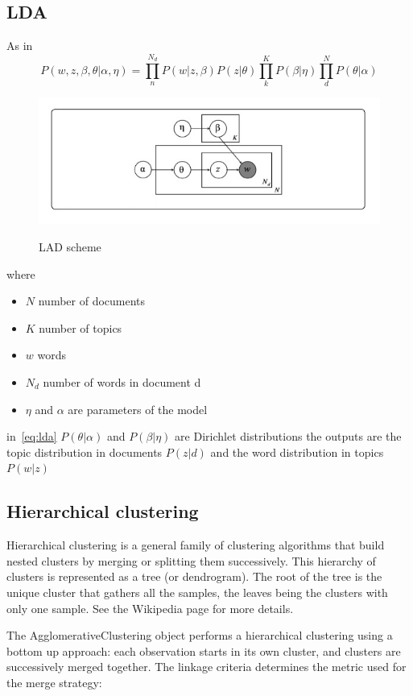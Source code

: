 \subsection{LDA}

As in ~\cite{Zhou2016}
\begin{equation}\label{eq:lda}
  P(w, z,\beta, \theta| \alpha, \eta)=\prod_n^{N_d} P(w|z,\beta)P(z|\theta)\prod_k^KP(\beta|\eta)\prod_d^N P(\theta | \alpha)
\end{equation}

\begin{figure}
  \centering
  \includegraphics[width=0.5\linewidth]{pictures/topic/LDA.jpeg}
  \label{fig:LDA}
  \caption{LAD scheme}
\end{figure}
where
\begin{itemize}
  \item $N$ number of documents
  \item $K$ number of topics
  \item $w$ words
  \item $N_d$ number of words in document d
  \item $\eta$ and $\alpha$ are parameters of the model
\end{itemize}
in~\ref{eq:lda} $P(\theta | \alpha)$ and $P(\beta|\eta)$ are Dirichlet distributions the outputs are the topic distribution in documents $P(z|d)$ and the word distribution in topics $P(w|z)$

\subsection{Hierarchical clustering}


Hierarchical clustering is a general family of clustering algorithms that build nested clusters by merging or splitting them successively. This hierarchy of clusters is represented as a tree (or dendrogram). The root of the tree is the unique cluster that gathers all the samples, the leaves being the clusters with only one sample. See the Wikipedia page for more details.

The AgglomerativeClustering object performs a hierarchical clustering using a bottom up approach: each observation starts in its own cluster, and clusters are successively merged together. The linkage criteria determines the metric used for the merge strategy:

